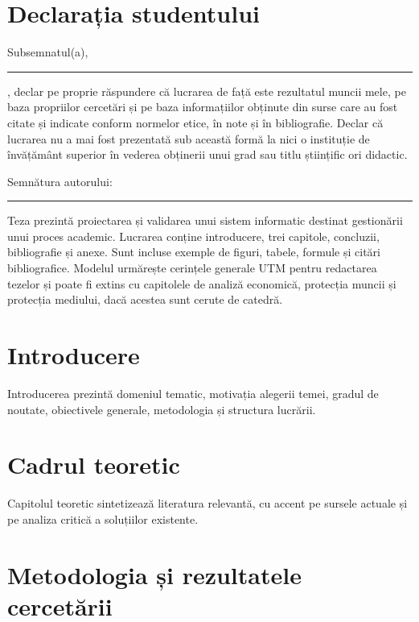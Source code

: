 \documentclass[thesis]{../shared/classes/utmreport}
\begin{document}
\makeutmcover
\makeutmthesistitlepage

\chapter*{Declarația studentului}
Subsemnatul(a), \rule{6cm}{0.4pt}, declar pe proprie răspundere că lucrarea de față este rezultatul muncii mele, pe baza propriilor cercetări și pe baza informațiilor obținute din surse care au fost citate și indicate conform normelor etice, în note și în bibliografie. Declar că lucrarea nu a mai fost prezentată sub această formă la nici o instituție de învățământ superior în vederea obținerii unui grad sau titlu științific ori didactic.

\vspace{1cm}
\noindent Semnătura autorului: \rule{6cm}{0.4pt}
\clearpage

\begin{utmabstract}[Rezumat]
Teza prezintă proiectarea și validarea unui sistem informatic destinat gestionării unui proces academic. Lucrarea conține introducere, trei capitole, concluzii, bibliografie și anexe. Sunt incluse exemple de figuri, tabele, formule și citări bibliografice. Modelul urmărește cerințele generale UTM pentru redactarea tezelor și poate fi extins cu capitolele de analiză economică, protecția muncii și protecția mediului, dacă acestea sunt cerute de catedră.

\end{utmabstract}

\tableofcontents
\clearpage

\chapter{Introducere}

Introducerea prezintă domeniul tematic, motivația alegerii temei, gradul de noutate, obiectivele generale, metodologia și structura lucrării.

\chapter{Cadrul teoretic}

Capitolul teoretic sintetizează literatura relevantă, cu accent pe sursele actuale și pe analiza critică a soluțiilor existente.

\chapter{Metodologia și rezultatele cercetării}
\end{document}
